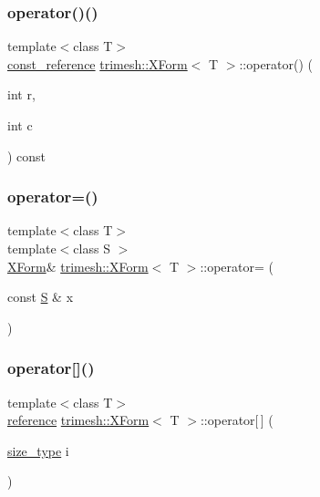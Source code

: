 \subsubsection{\texorpdfstring{operator()()}{operator()()}\hspace{0.1cm}{\footnotesize\ttfamily [4/4]}}
{\footnotesize\ttfamily template$<$class T$>$ \\
\hyperlink{classtrimesh_1_1XForm_a33bd450d8902f70aaf7d4bf9fec01502}{const\+\_\+reference} \hyperlink{classtrimesh_1_1XForm}{trimesh\+::\+X\+Form}$<$ T $>$\+::operator() (\begin{DoxyParamCaption}\item[{int}]{r,  }\item[{int}]{c }\end{DoxyParamCaption}) const\hspace{0.3cm}{\ttfamily [inline]}}

\mbox{\label{classtrimesh_1_1XForm_a7bc55b666906296d2079ef12e0786a4f}} 
\subsubsection{\texorpdfstring{operator=()}{operator=()}}
{\footnotesize\ttfamily template$<$class T$>$ \\
template$<$class S $>$ \\
\hyperlink{classtrimesh_1_1XForm}{X\+Form}\& \hyperlink{classtrimesh_1_1XForm}{trimesh\+::\+X\+Form}$<$ T $>$\+::operator= (\begin{DoxyParamCaption}\item[{const \hyperlink{ego_8cc_abde73cd36321648268fb4543509b996a}{S} \&}]{x }\end{DoxyParamCaption})\hspace{0.3cm}{\ttfamily [inline]}}

\mbox{\label{classtrimesh_1_1XForm_a65fd04c7ce3d18070b5a46c60fc9d2e5}} 
\subsubsection{\texorpdfstring{operator[]()}{operator[]()}\hspace{0.1cm}{\footnotesize\ttfamily [1/4]}}
{\footnotesize\ttfamily template$<$class T$>$ \\
\hyperlink{classtrimesh_1_1XForm_afef5285ff7d9ea2e25a4bb4d966bd674}{reference} \hyperlink{classtrimesh_1_1XForm}{trimesh\+::\+X\+Form}$<$ T $>$\+::operator\mbox{[}$\,$\mbox{]} (\begin{DoxyParamCaption}\item[{\hyperlink{classtrimesh_1_1XForm_aa219f141417c9026a74dec8b6279d4bf}{size\+\_\+type}}]{i }\end{DoxyParamCaption})\hspace{0.3cm}{\ttfamily [inline]}}

